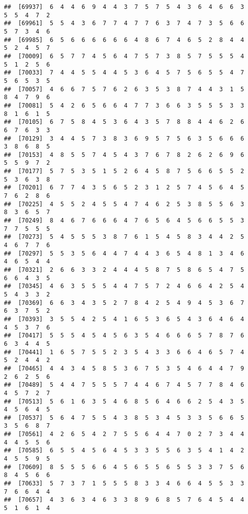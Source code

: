 \documentclass[
]{book}
\begin{document}
\begin{verbatim}
##  [69937]  6  4  4  6  9  4  4  3  7  5  7  5  4  3  6  4  6  6  3  5  5  4  7  2
##  [69961]  5  5  4  3  6  7  7  4  7  7  6  3  7  4  7  3  5  6  6  5  7  3  4  6
##  [69985]  6  5  6  6  6  6  6  6  4  8  6  7  4  6  5  2  8  4  4  5  2  4  5  7
##  [70009]  6  5  7  7  4  5  6  4  7  5  7  3  8  5  7  5  5  5  4  5  1  2  5  6
##  [70033]  7  4  4  5  5  4  4  5  3  6  4  5  7  5  6  5  5  4  7  5  6  5  3  5
##  [70057]  4  6  6  7  5  7  6  2  6  3  5  3  8  7  4  4  3  1  5  8  4  7  9  6
##  [70081]  5  4  2  6  5  6  6  4  7  7  3  6  6  3  5  5  5  3  3  8  1  6  1  5
##  [70105]  6  7  5  8  4  5  3  6  4  3  5  7  8  8  4  4  6  2  6  6  7  6  3  3
##  [70129]  3  4  4  5  7  3  8  3  6  9  5  7  5  6  3  5  6  6  6  3  8  6  8  5
##  [70153]  4  8  5  5  7  4  5  4  3  7  6  7  8  2  6  2  6  9  6  5  5  9  7  2
##  [70177]  5  7  5  3  5  1  5  2  6  4  5  8  7  5  6  6  5  5  2  5  3  6  3  8
##  [70201]  6  7  7  4  3  5  6  5  2  3  1  2  5  7  4  5  6  4  5  7  6  2  8  6
##  [70225]  4  5  5  2  4  5  5  4  7  4  6  2  5  3  8  5  5  6  3  8  3  6  5  7
##  [70249]  8  4  6  7  6  6  6  4  7  6  5  6  4  5  6  6  5  5  3  7  7  5  5  5
##  [70273]  5  4  5  5  5  3  8  7  6  1  5  4  5  8  3  4  4  2  5  4  6  7  7  6
##  [70297]  5  5  3  5  6  4  4  7  4  4  3  6  5  4  8  1  3  4  6  4  6  5  4  4
##  [70321]  2  6  6  3  3  2  4  4  4  5  8  7  5  8  6  5  4  7  5  6  6  4  3  5
##  [70345]  4  6  3  5  5  5  4  4  7  5  7  2  4  6  6  4  2  5  4  5  4  3  3  2
##  [70369]  6  6  3  4  3  5  2  7  8  4  2  5  4  9  4  5  3  6  7  6  3  7  5  2
##  [70393]  3  5  5  4  2  5  4  1  6  5  3  6  5  4  3  6  4  6  4  4  5  3  7  6
##  [70417]  5  5  5  4  5  4  5  6  3  5  4  6  6  6  5  7  8  7  6  6  3  4  4  5
##  [70441]  1  6  5  7  5  5  2  3  5  4  3  3  6  6  4  6  5  7  4  5  2  4  4  2
##  [70465]  4  4  3  4  5  8  5  3  6  7  5  3  5  4  6  4  4  7  9  2  6  2  5  6
##  [70489]  5  4  4  7  5  5  5  7  4  4  6  7  4  5  7  7  8  4  6  4  5  7  2  7
##  [70513]  5  6  1  6  3  5  4  6  8  5  6  4  6  6  2  5  4  3  5  4  5  6  4  5
##  [70537]  5  6  4  7  5  5  4  3  8  5  3  4  5  3  3  5  6  6  5  3  5  6  8  7
##  [70561]  4  2  6  5  4  2  7  5  5  6  4  4  7  0  2  7  3  4  4  4  4  5  5  6
##  [70585]  6  5  5  4  5  6  4  5  3  3  5  5  6  3  5  4  1  4  2  4  5  5  9  5
##  [70609]  8  5  5  5  6  6  4  5  6  5  5  6  5  5  3  3  7  5  6  8  4  5  6  6
##  [70633]  5  7  3  7  1  5  5  5  8  3  3  4  6  6  4  5  5  3  3  7  6  6  4  4
##  [70657]  4  3  6  3  4  6  3  3  8  9  6  8  5  7  6  4  5  4  4  5  1  6  1  4

\end{verbatim}
\end{document}
